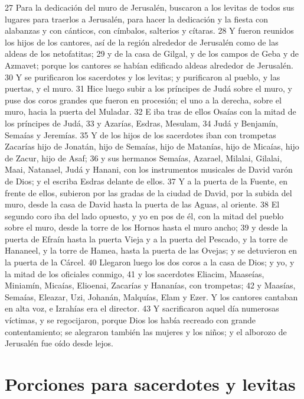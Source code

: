 27 Para la dedicación del muro de Jerusalén, buscaron a los levitas de todos sus lugares para traerlos a Jerusalén, para hacer la dedicación y la fiesta con alabanzas y con cánticos, con címbalos, salterios y cítaras.
28 Y fueron reunidos los hijos de los cantores, así de la región alrededor de Jerusalén como de las aldeas de los netofatitas; 
29 y de la casa de Gilgal, y de los campos de Geba y de Azmavet; porque los cantores se habían edificado aldeas alrededor de Jerusalén.
30 Y se purificaron los sacerdotes y los levitas; y purificaron al pueblo, y las puertas, y el muro.
31 Hice luego subir a los príncipes de Judá sobre el muro, y puse dos coros grandes que fueron en procesión; el uno a la derecha, sobre el muro, hacia la puerta del Muladar.
32 E iba tras de ellos Osaías con la mitad de los príncipes de Judá,
33 y Azarías, Esdras, Mesulam,
34 Judá y Benjamín, Semaías y Jeremías.
35 Y de los hijos de los sacerdotes iban con trompetas Zacarías hijo de Jonatán, hijo de Semaías, hijo de Matanías, hijo de Micaías, hijo de Zacur, hijo de Asaf;
36 y sus hermanos Semaías, Azarael, Milalai, Gilalai, Maai, Natanael, Judá y Hanani, con los instrumentos musicales de David varón de Dios; y el escriba Esdras delante de ellos.
37 Y a la puerta de la Fuente, en frente de ellos, subieron por las gradas de la ciudad de David, por la subida del muro, desde la casa de David hasta la puerta de las Aguas, al oriente.
38 El segundo coro iba del lado opuesto, y yo en pos de él, con la mitad del pueblo sobre el muro, desde la torre de los Hornos hasta el muro ancho;
39 y desde la puerta de Efraín hasta la puerta Vieja y a la puerta del Pescado, y la torre de Hananeel, y la torre de Hamea, hasta la puerta de las Ovejas; y se detuvieron en la puerta de la Cárcel.
40 Llegaron luego los dos coros a la casa de Dios; y yo, y la mitad de los oficiales conmigo,
41 y los sacerdotes Eliacim, Maaseías, Miniamín, Micaías, Elioenai, Zacarías y Hananías, con trompetas;
42 y Maasías, Semaías, Eleazar, Uzi, Johanán, Malquías, Elam y Ezer. Y los cantores cantaban en alta voz, e Izrahías era el director.
43 Y sacrificaron aquel día numerosas víctimas, y se regocijaron, porque Dios los había recreado con grande contentamiento; se alegraron también las mujeres y los niños; y el alborozo de Jerusalén fue oído desde lejos.
\section*{Porciones para sacerdotes y levitas}

